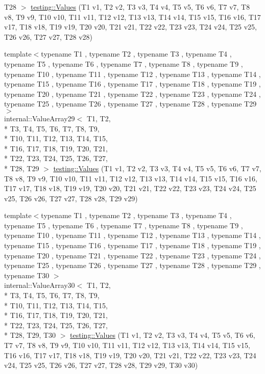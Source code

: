 \begin{DoxyCompactItemize}
T28 $>$ \hyperlink{namespacetesting_a5785254e0510108d9d422e32ba18f170}{testing\-::\-Values} (T1 v1, T2 v2, T3 v3, T4 v4, T5 v5, T6 v6, T7 v7, T8 v8, T9 v9, T10 v10, T11 v11, T12 v12, T13 v13, T14 v14, T15 v15, T16 v16, T17 v17, T18 v18, T19 v19, T20 v20, T21 v21, T22 v22, T23 v23, T24 v24, T25 v25, T26 v26, T27 v27, T28 v28)
\item 
{\footnotesize template$<$typename T1 , typename T2 , typename T3 , typename T4 , typename T5 , typename T6 , typename T7 , typename T8 , typename T9 , typename T10 , typename T11 , typename T12 , typename T13 , typename T14 , typename T15 , typename T16 , typename T17 , typename T18 , typename T19 , typename T20 , typename T21 , typename T22 , typename T23 , typename T24 , typename T25 , typename T26 , typename T27 , typename T28 , typename T29 $>$ }\\internal\-::\-Value\-Array29$<$ T1, T2, \\*
T3, T4, T5, T6, T7, T8, T9, \\*
T10, T11, T12, T13, T14, T15, \\*
T16, T17, T18, T19, T20, T21, \\*
T22, T23, T24, T25, T26, T27, \\*
T28, T29 $>$ \hyperlink{namespacetesting_a3d8a9bd3f027d89ff2873e3f0ff396cb}{testing\-::\-Values} (T1 v1, T2 v2, T3 v3, T4 v4, T5 v5, T6 v6, T7 v7, T8 v8, T9 v9, T10 v10, T11 v11, T12 v12, T13 v13, T14 v14, T15 v15, T16 v16, T17 v17, T18 v18, T19 v19, T20 v20, T21 v21, T22 v22, T23 v23, T24 v24, T25 v25, T26 v26, T27 v27, T28 v28, T29 v29)
\item 
{\footnotesize template$<$typename T1 , typename T2 , typename T3 , typename T4 , typename T5 , typename T6 , typename T7 , typename T8 , typename T9 , typename T10 , typename T11 , typename T12 , typename T13 , typename T14 , typename T15 , typename T16 , typename T17 , typename T18 , typename T19 , typename T20 , typename T21 , typename T22 , typename T23 , typename T24 , typename T25 , typename T26 , typename T27 , typename T28 , typename T29 , typename T30 $>$ }\\internal\-::\-Value\-Array30$<$ T1, T2, \\*
T3, T4, T5, T6, T7, T8, T9, \\*
T10, T11, T12, T13, T14, T15, \\*
T16, T17, T18, T19, T20, T21, \\*
T22, T23, T24, T25, T26, T27, \\*
T28, T29, T30 $>$ \hyperlink{namespacetesting_a016767be70ad0412bdbf837bc4d3ca98}{testing\-::\-Values} (T1 v1, T2 v2, T3 v3, T4 v4, T5 v5, T6 v6, T7 v7, T8 v8, T9 v9, T10 v10, T11 v11, T12 v12, T13 v13, T14 v14, T15 v15, T16 v16, T17 v17, T18 v18, T19 v19, T20 v20, T21 v21, T22 v22, T23 v23, T24 v24, T25 v25, T26 v26, T27 v27, T28 v28, T29 v29, T30 v30)

\end{DoxyCompactItemize}
